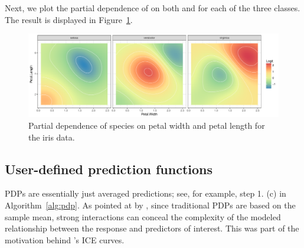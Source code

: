 Next, we plot the partial dependence of  on both  and  for each of the three classes. The result is displayed in Figure~\ref{fig:partial_iris}. %

\begin{figure}[!htbp]
  \centering
  \includegraphics[width=1.0\linewidth]{partial_iris_svm}
  \caption{Partial dependence of species on petal width and petal length for the iris data.}
  \label{fig:partial_iris}
\end{figure}


\subsection{User-defined prediction functions}
\label{sec:prediction}

PDPs are essentially just averaged predictions; see, for example, step 1. (c) in Algorithm~\ref{alg:pdp}. As pointed at by \citet{goldstein-peeking-2015}, since traditional PDPs are based on the sample mean, strong interactions can conceal the complexity of the modeled relationship between the response and predictors of interest. This was part of the motivation behind \citeauthor*{goldstein-peeking-2015}'s ICE curves.


